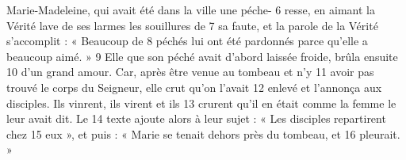 Marie-Madeleine, qui avait été dans la ville une péche-	 
6	 	resse, en aimant la Vérité lave de ses larmes les souillures de	 
7	 	sa faute, et la parole de la Vérité s'accomplit : « Beaucoup de	 
8	 	péchés lui ont été pardonnés parce qu'elle a beaucoup aimé. »	 
9	 	Elle que son péché avait d'abord laissée froide, brûla ensuite	 
10	 	d'un grand amour. Car, après être venue au tombeau et n'y	 
11	 	avoir pas trouvé le corps du Seigneur, elle crut qu'on l'avait	 
12	 	enlevé et l'annonça aux disciples. Ils vinrent, ils virent et ils	 
13	 	crurent qu'il en était comme la femme le leur avait dit. Le	 
14	 	texte ajoute alors à leur sujet : « Les disciples repartirent chez	 
15	 	eux », et puis : « Marie se tenait dehors près du tombeau, et	 
16	 	pleurait. »